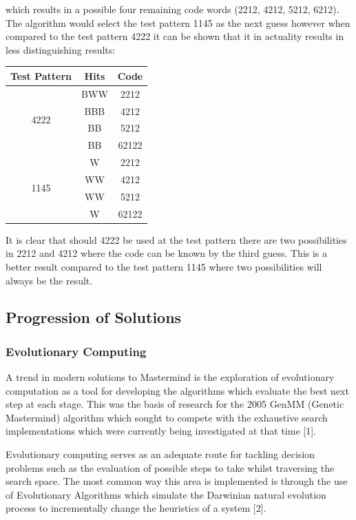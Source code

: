 \documentclass[12pt]{article}  %
\theoremstyle{definition}
\theoremstyle{remark}
\begin{document}
which results in a possible four remaining code words (2212, 4212, 5212, 6212). The algorithm would select the test pattern 1145 as the next guess however when compared to the test pattern 4222 it can be shown that it in actuality results in less distinguishing results:
\\
{
\centering
\begin{tabular}{ccc}
Test Pattern          & Hits & Code  \\ \hline
\multirow{4}{*}{4222} & BWW  & 2212  \\
                      & BBB  & 4212  \\
                      & BB   & 5212  \\
                      & BB   & 62122 \\ \hline
\multirow{4}{*}{1145} & W    & 2212  \\
                      & WW   & 4212  \\
                      & WW   & 5212  \\
                      & W    & 62122
\end{tabular} \par
} 

It is clear that should 4222 be used at the test pattern there are two possibilities in 2212 and 4212 where the code can be known by the third guess. This is a better result compared to the test pattern 1145 where two possibilities will always be the result.

\subsection {Progression of Solutions}

\subsubsection {Evolutionary Computing}
A trend in modern solutions to Mastermind is the exploration of evolutionary computation as a tool for developing the algorithms which evaluate the best next step at each stage. 
This was the basis of research for the 2005 GenMM (Genetic Mastermind) algorithm which sought to compete with the exhaustive search implementations which were currently being investigated at that time [1]. 

Evolutionary computing serves as an adequate route for tackling decision problems such as the evaluation of possible steps to take whilst traversing the search space. 
The most common way this area is implemented is through the use of Evolutionary Algorithms which simulate the Darwinian natural evolution process to incrementally change the heuristics of a system [2].
\end{document}
